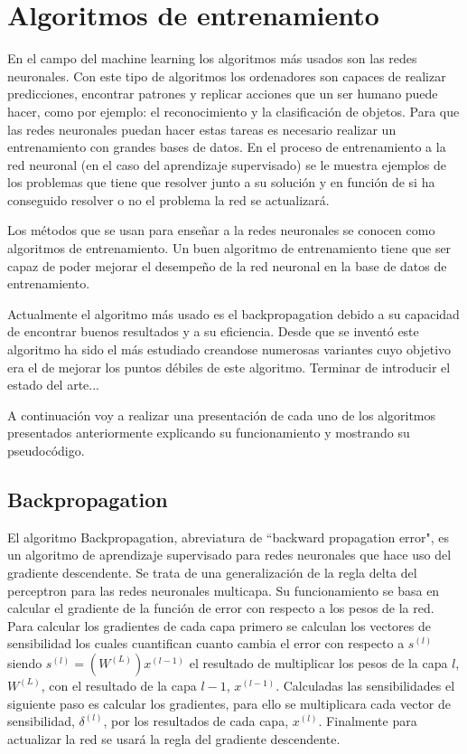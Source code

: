 \chapter{Algoritmos de entrenamiento}

En el campo del machine learning los algoritmos más usados son las redes neuronales. Con este tipo de algoritmos los ordenadores son capaces de realizar predicciones, encontrar patrones y replicar acciones que un ser humano puede hacer, como por ejemplo: el reconocimiento y la clasificación de objetos. Para que las redes neuronales puedan hacer estas tareas es necesario realizar un entrenamiento con grandes bases de datos. En el proceso de entrenamiento a la red neuronal (en el caso del aprendizaje supervisado) se le muestra ejemplos de los problemas que tiene que resolver junto a su solución y en función de si ha conseguido resolver o no el problema la red se actualizará. 

Los métodos que se usan para enseñar a la redes neuronales se conocen como algoritmos de entrenamiento. Un buen algoritmo de entrenamiento tiene que ser capaz de poder mejorar el desempeño de la red neuronal en la base de datos de entrenamiento.

Actualmente el algoritmo más usado es el backpropagation \cite{RefWorks:RefID:6-rumelhart1986learning} debido a su capacidad de encontrar buenos resultados y a su eficiencia. Desde que se inventó este algoritmo ha sido el más estudiado creandose numerosas variantes cuyo objetivo era el de mejorar los puntos débiles de este algoritmo. Terminar de introducir el estado del arte...

A continuación voy a realizar una presentación de cada uno de los algoritmos presentados anteriormente explicando su funcionamiento y mostrando su pseudocódigo.
\newpage
\section{Backpropagation} \label{tab:Backprop}

El algoritmo Backpropagation, abreviatura de ``backward propagation error", es un algoritmo de aprendizaje supervisado para redes neuronales que hace uso del gradiente descendente. Se trata de una generalización de la regla delta del perceptron para las redes neuronales multicapa. Su funcionamiento se basa en calcular el gradiente de la función de error con respecto a los pesos de la red. Para calcular los gradientes de cada capa primero se calculan los vectores de sensibilidad los cuales cuantifican cuanto cambia el error con respecto a $s^{(l)}$ siendo $s^{(l)} = (W^{(L)})x^{(l-1)}$ el resultado de multiplicar los pesos de la capa $l$, $W^{(L)}$, con el resultado de la capa $l-1$, $x^{(l-1)}$. Calculadas las sensibilidades el siguiente paso es calcular los gradientes, para ello se multiplicara cada vector de sensibilidad, $\delta^{(l)}$, por los resultados de cada capa, $x^{(l)}$. Finalmente para actualizar la red se usará la regla del gradiente descendente.

